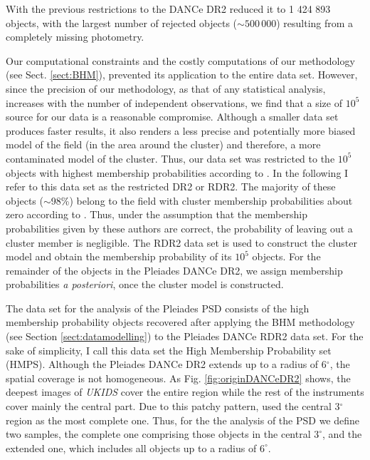 With the previous restrictions to the DANCe DR2 reduced it to 1 424 893 objects, with the largest number of rejected objects ($\sim 500\, 000$) resulting from a completely missing photometry.

Our computational constraints and the costly computations of our methodology (see Sect. \ref{sect:BHM}), prevented its application to the entire data set. However, since the precision of our methodology, as that of any statistical analysis, increases with the number of independent observations, we find that a size of $10^5$ source for our data is a reasonable compromise. Although a smaller data set produces faster results, it also renders a less precise and potentially more biased model of the field (in the area around the cluster) and therefore, a more contaminated model of the cluster. Thus, our data set was restricted to the $10^5$ objects with highest membership probabilities according to \citet{Bouy2015}. In the following I refer to this data set as the restricted DR2 or RDR2. The majority of these objects ($\sim$98\%) belong to the field with cluster membership probabilities about zero according to \citet{Sarro2014,Bouy2015}. Thus, under the assumption that the membership probabilities given by these authors are correct, the probability of leaving out a cluster member is negligible. {The RDR2 data set is used to construct the cluster model and obtain the membership probability of its $10^5$ objects. }For the remainder of the objects in the Pleiades DANCe DR2, we assign membership probabilities \emph{a posteriori}, once the cluster model is constructed. 

{The data set for the analysis of the Pleiades PSD consists of the high membership probability objects recovered after applying the BHM methodology (see Section \ref{sect:datamodelling}) to the Pleiades DANCe RDR2 data set. For the sake of simplicity, I call this data set the High Membership Probability set (HMPS). Although the Pleiades DANCe DR2 extends up to a radius of 6$^{\circ}$, the spatial coverage is not homogeneous. As Fig. \ref{fig:originDANCeDR2} shows, the deepest images of \emph{UKIDS} cover the entire region while the rest of the instruments cover mainly the central part. Due to this patchy pattern, \citet{Bouy2015} used the central 3$^{\circ}$ region as the most complete one. Thus, for the the analysis of the PSD we define two samples, the complete one comprising those objects in the central $3^{\circ}$, and the extended one, which includes all objects up to a radius of $6^{\circ}$. }



